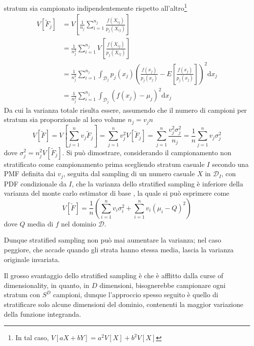 stratum sia campionato indipendentemente rispetto all'altro\footnote{In tal caso, $V[aX+bY]=a^2V[X]+b^2V[X]$}
\begin{align}
	V\left[\tilde{F}_j\right]&=V\left[\frac{1}{n_j}\sum_{i=1}^{n_j}\frac{f(X_{ij})}{p_j(X_{ij})}\right] \nonumber \\
		&=\frac{1}{n_j^2}\sum_{i=1}^{n_j}V\left[\frac{f(X_{ij})}{p_j(X_{ij})}\right] \nonumber \\
		&=\frac{1}{n_j^2}\sum_{i=1}^{n_j}\int_{\mathcal{D}_j}p_j(x_j)\left(\frac{f(x_j)}{p_j(x_j)}-E\left[\frac{f(x_j)}{p_j(x_j)}\right]\right)^2
			\mathrm{d}x_j \nonumber \\
		&=\frac{1}{n_j^2}\sum_{i=1}^{n_j}\int_{\mathcal{D}_j}\left(f(x_j)-\mu_j\right)^2\mathrm{d}x_j
\end{align}
Da cui la varianza totale risulta essere, assumendo che il numero di campioni per stratum sia proporzionale al loro volume \mbox{$n_j=v_jn$}
\begin{equation}
	V\left[\tilde{F}\right]=V\left[\sum_{j=1}^nv_j\tilde{F}_j\right]=\sum_{j=1}^nv_j^2V\left[\tilde{F}_j\right]
		=\sum_{j=1}^n\frac{v_j^2\sigma_j^2}{n_j}=\frac{1}{n}\sum_{j=1}^nv_j\sigma_j^2
\end{equation}
dove $\sigma_j^2 = n_j^2V\left[\tilde{F}_j\right]$. Si pu\`o dimostrare, considerando il campionamento non stratificato come campionamento prima 
scegliendo stratum casuale $I$ secondo una PMF definita dai $v_j$, seguita dal sampling di un numero casuale $X$ in $\mathcal{D}_I$, con PDF 
condizionale da $I$, che la varianza dello stratified sampling \`e inferiore della varianza del monte carlo estimator di base \cite{pharr}, la 
quale si pu\`o esprimere come
\begin{equation}
	V\left[{\tilde{F}}\right]=\frac{1}{n}\left(\sum_{i=1}^nv_i\sigma_i^2+\sum_{i=1}^nv_i(\mu_i-Q)^2\right)
\end{equation}
dove $Q$ media di $f$ nel dominio $\mathcal{D}$.\par
Dunque stratified sampling non pu\`o mai aumentare la varianza; nel caso peggiore, che accade quando
gli strata hanno stessa media, lascia la varianza originale invariata.\par
Il grosso svantaggio dello stratified sampling \`e che \`e afflitto dalla curse of dimensionality, in quanto, in $D$ dimensioni, bisognerebbe 
campionare ogni stratum con $S^D$ campioni, dunque l'approccio spesso seguito \`e quello di stratificare solo alcune dimensioni del dominio, contenenti
la maggior variazione della funzione integranda.
